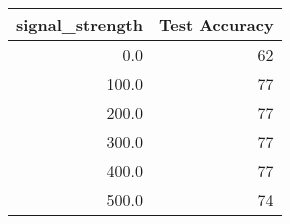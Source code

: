 \begin{tabular}{rr}
\toprule
 signal\_strength &  Test Accuracy \\
\midrule
             0.0 &             62 \\
           100.0 &             77 \\
           200.0 &             77 \\
           300.0 &             77 \\
           400.0 &             77 \\
           500.0 &             74 \\
\bottomrule
\end{tabular}
